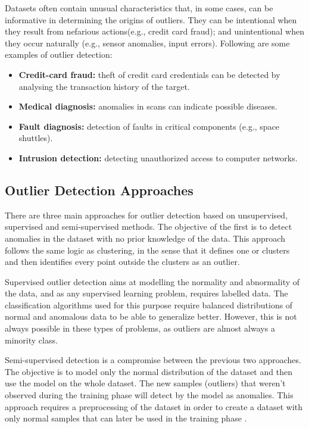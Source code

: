 Datasets often contain unusual characteristics that, in some cases, can be informative in determining the origins of outliers. They can be intentional when they result from nefarious actions(e.g., credit card fraud); and unintentional when they occur naturally (e.g., sensor anomalies, input errors). Following are some examples of outlier detection: 

\begin{itemize}
    \item \textbf{Credit-card fraud:} theft of credit card credentials can be detected by analysing the transaction history of the target.
    \item \textbf{Medical diagnosis:} anomalies in scans can indicate possible diseases.
    \item \textbf{Fault diagnosis:} detection of faults in critical components (e.g., space shuttles).
    \item  \textbf{Intrusion detection:} detecting unauthorized access to computer networks.
\end{itemize}

\subsection{Outlier Detection Approaches}
There are three main approaches for outlier detection based on unsupervised, supervised and semi-supervised methods. The objective of the first is to detect anomalies in the dataset with no prior knowledge of the data. This approach follows the same logic as clustering, in the sense that it defines one or clusters and then identifies every point outside the clusters as an outlier.

Supervised outlier detection aims at modelling the normality and abnormality of the data, and as any supervised learning problem, requires labelled data. The classification algorithms used for this purpose require balanced distributions of normal and anomalous data to be able to generalize better. However, this is not always possible in these types of problems, as outliers are almost always a minority class.

Semi-supervised detection is a compromise between the previous two approaches. The objective is to model only the normal distribution of the dataset and then use the model on the whole dataset. The new samples (outliers) that weren't observed during the training phase will detect by the model as anomalies. This approach requires a preprocessing of the dataset in order to create a dataset with only normal samples that can later be used in the training phase \cite{hodge.austin_SurveyOutlierDetection_2004}.


